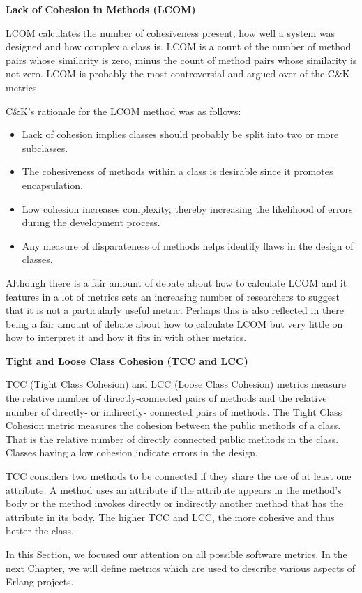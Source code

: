\textbf{Lack of Cohesion in Methods (LCOM)}

LCOM calculates the number of cohesiveness present, how well a system was designed and how complex a class is. LCOM is a count of the number of method pairs whose similarity is zero, minus the count of method pairs whose similarity is not zero. LCOM is probably the most controversial and argued over of the C\&K metrics.

C\&K's rationale for the LCOM method was as follows:
\begin{itemize}
	\item Lack of cohesion implies classes should probably be split into two or more subclasses.
	\item The cohesiveness of methods within a class is desirable since it promotes encapsulation.
	\item Low cohesion increases complexity, thereby increasing the likelihood of errors during the development process.
	\item Any measure of disparateness of methods helps identify flaws in the design of classes. 
\end{itemize}

Although there is a fair amount of debate about how to calculate LCOM and it features in a lot of metrics sets an increasing number of researchers to suggest that it is not a particularly useful metric. Perhaps this is also reflected in there being a fair amount of debate about how to calculate LCOM but very little on how to interpret it and how it fits in with other metrics. 

\textbf{Tight and Loose Class Cohesion (TCC and LCC)}

TCC (Tight Class Cohesion) and LCC (Loose Class Cohesion) metrics measure the relative number of directly-connected pairs of methods and the relative number of directly- or indirectly- connected pairs of methods.
The Tight Class Cohesion metric measures the cohesion between the public methods of a class. That is the relative number of directly connected public methods in the class. Classes having a low cohesion indicate errors in the design.

TCC considers two methods to be connected if they share the use of at least one attribute. A method uses an attribute if the attribute appears in the method’s body or the method invokes directly or indirectly another method that has the attribute in its body. The higher TCC and LCC, the more cohesive and thus better the class.

In this Section, we focused our attention on all possible software metrics. In the next Chapter, we will define metrics which are used to describe various aspects of Erlang projects. 

